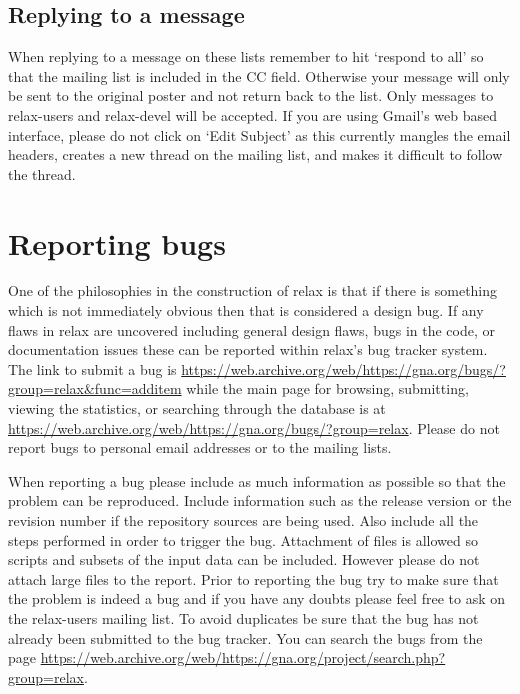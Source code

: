 \subsection{Replying to a message}

When replying to a message on these lists remember to hit `respond to all' so that the mailing list is included in the CC field.
Otherwise your message will only be sent to the original poster and not return back to the list.
Only messages to relax-users and relax-devel will be accepted.
If you are using Gmail's web based interface, please do not click on `Edit Subject' as this currently mangles the email headers, creates a new thread on the mailing list, and makes it difficult to follow the thread.




\section{Reporting bugs}\label{reporting bugs}

One of the philosophies in the construction of relax is that if there is something which is not immediately obvious then that is considered a design bug.
If any flaws in relax are uncovered including general design flaws, bugs in the code, or documentation issues these can be reported within relax's bug tracker system.
The link to submit a bug is \href{https://web.archive.org/web/https://gna.org/bugs/?group=relax\&func=additem}{https://web.archive.org/web/https://gna.org/bugs/?group=relax\&func=additem} while the main page for browsing, submitting, viewing the statistics, or searching through the database is at \href{https://web.archive.org/web/https://gna.org/bugs/?group=relax}{https://web.archive.org/web/https://gna.org/bugs/?group=relax}.
Please do not report bugs to personal email addresses or to the mailing lists.

When reporting a bug please include as much information as possible so that the problem can be reproduced.
Include information such as the release version or the revision number if the repository sources are being used.
Also include all the steps performed in order to trigger the bug.
Attachment of files is allowed so scripts and subsets of the input data can be included.
However please do not attach large files to the report.
Prior to reporting the bug try to make sure that the problem is indeed a bug and if you have any doubts please feel free to ask on the relax-users mailing list.
To avoid duplicates be sure that the bug has not already been submitted to the bug tracker.
You can search the bugs from the page \href{https://web.archive.org/web/https://gna.org/project/search.php?group=relax}{https://web.archive.org/web/https://gna.org/project/search.php?group=relax}.

